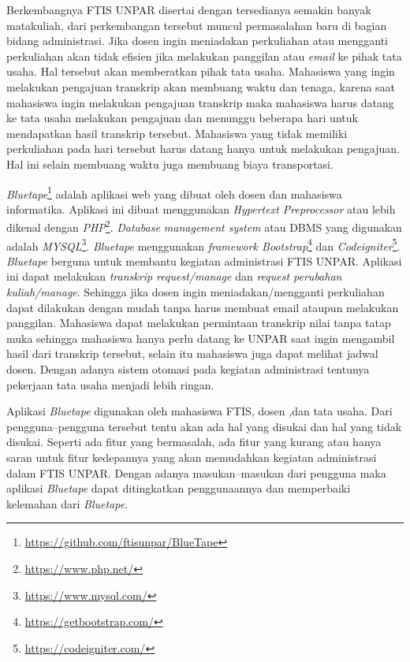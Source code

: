 \documentclass[a4paper,twoside]{article}
\begin{document}
 Berkembangnya FTIS UNPAR disertai dengan tersedianya semakin banyak matakuliah, dari perkembangan tersebut muncul permasalahan baru di bagian bidang administrasi. Jika dosen ingin meniadakan perkuliahan atau mengganti perkuliahan akan tidak efisien jika melakukan panggilan atau \textit{email} ke pihak tata usaha. Hal tersebut akan memberatkan pihak tata usaha. Mahasiswa yang ingin melakukan pengajuan transkrip akan membuang waktu dan tenaga, karena saat mahasiswa ingin melakukan pengajuan transkrip maka mahasiswa harus datang ke tata usaha melakukan pengajuan dan menunggu beberapa hari untuk mendapatkan hasil transkrip tersebut. Mahasiswa yang tidak memiliki perkuliahan pada hari tersebut harus datang hanya untuk melakukan pengajuan. Hal ini selain membuang waktu juga membuang biaya transportasi.


\textit{Bluetape}\footnote{\label{ft:bluetape}\url{https://github.com/ftisunpar/BlueTape}} adalah aplikasi web yang dibuat oleh dosen dan mahasiswa informatika. Aplikasi ini dibuat menggunakan \textit{Hypertext Preprocessor} atau lebih dikenal dengan \textit{PHP}\footnote{\url{https://www.php.net/}}. \textit{Database management system} atau DBMS yang digunakan adalah \textit{MYSQL}\footnote{\url{https://www.mysql.com/}}.\textit{ Bluetape} menggunakan \textit{framework Bootstrap}\footnote{\url{https://getbootstrap.com/}} dan \textit{Codeigniter}\footnote{\url{https://codeigniter.com/}}. \textit{Bluetape} berguna untuk membantu kegiatan administrasi FTIS UNPAR. Aplikasi ini dapat melakukan \textit{transkrip request/manage} dan \textit{request perubahan kuliah/manage}. Sehingga jika dosen ingin meniadakan/mengganti perkuliahan dapat dilakukan dengan mudah tanpa harus membuat email ataupun melakukan panggilan. Mahasiswa dapat melakukan permintaan transkrip nilai tanpa tatap muka sehingga mahasiswa hanya perlu datang ke UNPAR saat ingin mengambil hasil dari transkrip tersebut, selain itu mahasiswa juga dapat melihat jadwal dosen. Dengan adanya sistem otomasi pada kegiatan administrasi tentunya pekerjaan tata usaha menjadi lebih ringan. 


Aplikasi \textit{Bluetape} digunakan oleh mahasiswa FTIS, dosen ,dan tata usaha. Dari pengguna--pengguna tersebut tentu akan ada hal yang disukai dan hal yang tidak disukai. Seperti ada fitur yang bermasalah, ada fitur yang kurang atau hanya saran untuk fitur kedepannya yang akan memudahkan kegiatan administrasi dalam FTIS UNPAR. Dengan adanya masukan--masukan dari pengguna maka aplikasi \textit{Bluetape} dapat ditingkatkan penggunaannya dan memperbaiki kelemahan dari \textit{Bluetape}.
\end{document}
